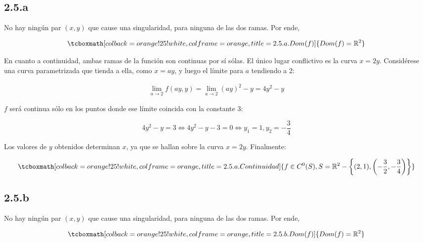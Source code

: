 \documentclass{article}
\renewcommand{\Bbb}{\mathbb}
\begin{document}
\subsection*{2.5.a}
\label{subsec:2.5.a}

No hay ningún par $(x,y)$ que cause una singularidad, para ninguna de las dos ramas. Por ende,

\begin{equation}
\tcboxmath[colback=orange!25!white,colframe=orange,title=2.5.a. Dom(f) ]
{ \mathop{Dom}(f) = \Bbb R^2 }
\end{equation}

En cuanto a continuidad, ambas ramas de la función son continuas por sí sólas. El único lugar conflictivo es la curva $x = 2y$. Considérese una curva parametrizada que tienda a ella, como $x = ay$, y luego el límite para $a$ tendiendo a 2:

\begin{subequations}
\begin{align}
\lim_{a \rightarrow 2} f(ay, y) = \lim_{a \rightarrow 2} (ay)^2 - y = 4y^2 - y
\end{align}
\end{subequations}

$f$ será continua sólo en los puntos donde ese límite coincida con la constante $3$:

\begin{equation}
4y^2 - y = 3 \Leftrightarrow 4y^2 - y - 3 = 0 \Leftrightarrow y_1 = 1, y_2 = -\frac{3}{4}
\end{equation}

Los valores de $y$ obtenidos determinan $x$, ya que se hallan sobre la curva $x = 2y$. Finalmente:

\begin{equation}
\tcboxmath[colback=orange!25!white,colframe=orange,title=2.5.a. Continuidad ]
{ f \in C^0(S), S = \Bbb R^2 - \left\{ (2, 1), \left(-\frac{3}{2}, -\frac{3}{4} \right) \right\} }
\end{equation}

\subsection*{2.5.b}
\label{subsec:2.5.b}

No hay ningún par $(x,y)$ que cause una singularidad, para ninguna de las dos ramas. Por ende,

\begin{equation}
\tcboxmath[colback=orange!25!white,colframe=orange,title=2.5.b. Dom(f) ]
{ \mathop{Dom}(f) = \Bbb R^2 }
\end{equation}
\end{document}
